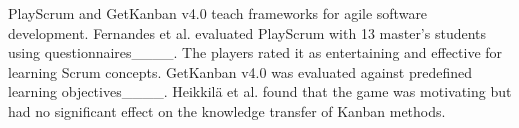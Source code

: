         PlayScrum and GetKanban v4.0 teach frameworks for agile software development. %
        Fernandes et al. evaluated PlayScrum with 13 master's students using questionnaires____. 
        The players rated it as entertaining and effective for learning Scrum concepts. 
        GetKanban v4.0  was evaluated against predefined learning objectives____. %
        Heikkilä et al. found that the game was motivating but had no significant effect on the knowledge transfer of Kanban methods.
        
